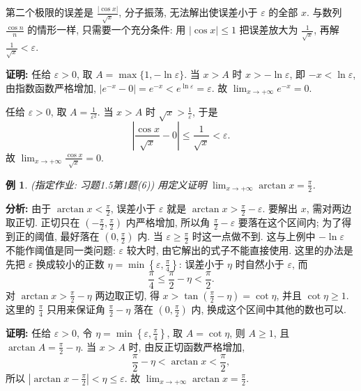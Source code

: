 \documentclass[UTF8,openany]{ctexbook}
\theoremstyle{chinesetextbook}
\newtheorem{example}{例}[section]
\newenvironment{cnproof}{\par\indent\textbf{证明:} \ignorespaces}{\par}
\begin{document}
第二个极限的误差是 $\displaystyle\frac{|\cos x|}{\sqrt x}$, 分子振荡, 无法解出使误差小于 $\varepsilon$ 的全部 $x$. 与数列 $\displaystyle\frac{\cos n}n$ 的情形一样, 只需要一个充分条件: 用 $|\cos x|\le1$ 把误差放大为 $\displaystyle\frac1{\sqrt x}$, 再解 $\displaystyle\frac1{\sqrt x}<\varepsilon$.
\begin{cnproof}
任给 $\varepsilon>0$, 取 $A=\max\{1,-\ln\varepsilon\}$. 当 $x>A$ 时 $x>-\ln\varepsilon$, 即 $-x<\ln\varepsilon$, 由指数函数严格增加, $|e^{-x}-0|=e^{-x}<e^{\ln\varepsilon}=\varepsilon$. 故 $\displaystyle\lim_{x\to+\infty}e^{-x}=0$.

任给 $\varepsilon>0$, 取 $\displaystyle A=\frac1{\varepsilon^2}$. 当 $x>A$ 时 $\displaystyle\sqrt x>\frac1\varepsilon$, 于是
\[
\left|\frac{\cos x}{\sqrt x}-0\right|\le\frac1{\sqrt x}<\varepsilon.
\]
故 $\displaystyle\lim_{x\to+\infty}\frac{\cos x}{\sqrt x}=0$.
\end{cnproof}
\begin{example}
\textnormal{(指定作业: 习题1.5第1题(6))} 用定义证明 $\displaystyle\lim_{x\to+\infty}\arctan x=\frac\pi2$.
\end{example}
\par\indent\textbf{分析:} 由于 $\displaystyle\arctan x<\frac\pi2$, 误差小于 $\varepsilon$ 就是 $\displaystyle\arctan x>\frac\pi2-\varepsilon$. 要解出 $x$, 需对两边取正切. 正切只在 $\displaystyle\left(-\frac\pi2,\frac\pi2\right)$ 内严格增加, 所以角 $\displaystyle\frac\pi2-\varepsilon$ 要落在这个区间内; 为了得到正的阈值, 最好落在 $\displaystyle\left(0,\frac\pi2\right)$ 内. 当 $\displaystyle\varepsilon\ge\frac\pi2$ 时这一点做不到. 这与上例中 $-\ln\varepsilon$ 不能作阈值是同一类问题: $\varepsilon$ 较大时, 由它解出的式子不能直接使用. 这里的办法是先把 $\varepsilon$ 换成较小的正数 $\displaystyle\eta=\min\left\{\varepsilon,\frac\pi4\right\}$: 误差小于 $\eta$ 时自然小于 $\varepsilon$, 而
\[
\frac\pi4\le\frac\pi2-\eta<\frac\pi2.
\]
对 $\displaystyle\arctan x>\frac\pi2-\eta$ 两边取正切, 得 $\displaystyle x>\tan\left(\frac\pi2-\eta\right)=\cot\eta$, 并且 $\cot\eta\ge1$. 这里的 $\displaystyle\frac\pi4$ 只用来保证角 $\displaystyle\frac\pi2-\eta$ 落在 $\displaystyle\left(0,\frac\pi2\right)$ 内, 换成这个区间中其他的数也可以.
\begin{cnproof}
任给 $\varepsilon>0$, 令 $\displaystyle\eta=\min\left\{\varepsilon,\frac\pi4\right\}$, 取 $A=\cot\eta$, 则 $A\ge1$, 且 $\displaystyle\arctan A=\frac\pi2-\eta$. 当 $x>A$ 时, 由反正切函数严格增加,
\[
\frac\pi2-\eta<\arctan x<\frac\pi2,
\]
所以 $\displaystyle\left|\arctan x-\frac\pi2\right|<\eta\le\varepsilon$. 故 $\displaystyle\lim_{x\to+\infty}\arctan x=\frac\pi2$.
\end{cnproof}
\end{document}
